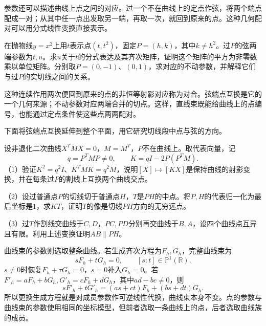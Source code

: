 参数还可以描述曲线上点之间的对应。过一个不在曲线上的定点作弦，将两个端点配成一对；从其中任一点出发取另一端，再取一次，就回到原来的点。这种几何配对可以用分式线性变换直接表示。

\par\addvspace{6pt}
\noindent\begin{minipage}{\linewidth}
\begin{example}\label{ex:quadratic-chord-parameter-involution}
在抛物线\(y=x^2\)上用\(t\)表示点\((t,t^2)\)，固定\(P=(h,k)\)，其中\(k\ne h^2\)。过\(P\)的弦两端参数为\(t,u\)。求\(u\)关于\(t\)的分式表达及其齐次矩阵，证明这个矩阵的平方为非零数乘以单位矩阵。分别取\(P=(0,-1)\)、\((0,1)\)，求对应的不动参数，并解释它们与过\(P\)的实切线之间的关系。
\end{example}
\end{minipage}\par\addvspace{6pt}

这种连续作用两次便回到原来的点的非恒等射影对应称为{\heiti{}对合}。弦端点互换是它的一个几何来源；不动参数对应两端合并的切点。这样，直线束既能给曲线上的点编号，也能通过定点条件使这些点两两配对。

下面将弦端点互换延伸到整个平面，用它研究切线段中点与弦的方向。

\par\noindent\begin{minipage}{\linewidth}
\setlength{\parindent}{0pt}
\setlength{\parskip}{6pt}
\begin{example}\label{ex:quadratic-plane-chord-involution}
设非退化二次曲线\(X^TMX=0\)，\(M=M^T\)，\(P\)不在曲线上。取代表向量，记
\begin{equation*}
 q=P^TMP\ne0,\qquad K=qI-2P(P^TM).
\end{equation*}
（1）验证\(K^2=q^2I\)、\(K^TMK=q^2M\)，说明\([X]\mapsto[KX]\)是保持曲线的射影变换，并在每条过\(P\)的割线上互换两个曲线交点。

（2）设过普通点\(P\)的切线切于普通点\(H\)，\(T\)是\(PH\)的中点。将\(P,H\)的代表归一化为最后坐标是\(1\)，求\(KT\)，证明\(T\)的像是切线\(PH\)方向的无穷远点。

（3）过\(T\)作割线交曲线于\(C,D\)，\(PC,PD\)分别再交曲线于\(B,A\)，设四个曲线点互异且有限。利用上述变换证明\(AB\parallel PH\)。
\end{example}
\end{minipage}\par

曲线束的参数则选取整条曲线。若生成齐次方程为\(F_h,G_h\)，完整曲线束为
\begin{equation}\label{eq:quadratic-projective-pencil-parameter}
 sF_h+tG_h=0,\qquad[s:t]\in\mathbb P^1(\mathbb R).
\end{equation}
\(s\ne0\)时恢复\(F_h+\tau G_h=0\)，\(s=0\)补入\(G_h=0\)。若\(F'_h=aF_h+bG_h,G'_h=cF_h+dG_h\)，其中\(ad-bc\ne0\)，则
\begin{equation*}
 sF'_h+tG'_h=(as+ct)F_h+(bs+dt)G_h.
\end{equation*}
所以更换生成方程就是对成员参数作可逆线性代换，曲线束本身不变。点的参数与曲线束的参数使用相同的坐标模型，但前者选取一条曲线上的点，后者选取曲线族的成员。

